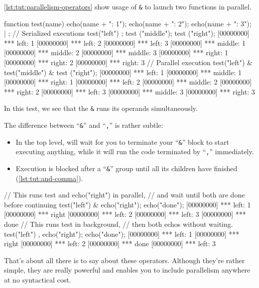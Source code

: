 \autoref{lst:tut:parallelism-operators} show usage of \lstinline{&} to
launch two functions in parallel.

\begin{urbiscript}[caption=Parallelism operator,
  label=lst:tut:parallelism-operators, name=parallel]
function test(name)
{
  echo(name + ": 1");
  echo(name + ": 2");
  echo(name + ": 3");
} | {};
// Serialized executions
test("left") ; test ("middle"); test ("right");
[00000000] *** left: 1
[00000000] *** left: 2
[00000000] *** left: 3
[00000000] *** middle: 1
[00000000] *** middle: 2
[00000000] *** middle: 3
[00000000] *** right: 1
[00000000] *** right: 2
[00000000] *** right: 3
// Parallel execution
test("left") & test("middle") & test ("right");
[00000000] *** left: 1
[00000000] *** middle: 1
[00000000] *** right: 1
[00000000] *** left: 2
[00000000] *** middle: 2
[00000000] *** right: 2
[00000000] *** left: 3
[00000000] *** middle: 3
[00000000] *** right: 3
\end{urbiscript}

In this test, we see that the \lstinline{&} runs its operands
simultaneously.

The difference between ``\lstinline{&}'' and ``\lstinline{,}'' is
rather subtle:

\begin{itemize}
\item In the top level, will wait for you to terminate your
  ``\lstinline{&}'' block to start executing anything, while it will
  run the code terminated by ``\lstinline{,}'' immediately.
\item Execution is blocked after a ``\lstinline{&}'' group until all
  its children have finished (\autoref{lst:tut:and-comma}).
\end{itemize}

\begin{urbiscript}[caption=Difference between ``\lstinline{&}'' and
``\lstinline{,}'', label=lst:tut:and-comma, name=parallel]
// This runs test and echo("right") in parallel,
// and wait until both are done before continuing
test("left") & echo("right"); echo("done");
[00000000] *** left: 1
[00000000] *** right
[00000000] *** left: 2
[00000000] *** left: 3
[00000000] *** done
// This runs test in background,
// then both echos without waiting.
test("left") , echo("right"); echo("done");
[00000000] *** left: 1
[00000000] *** right
[00000000] *** left: 2
[00000000] *** done
[00000000] *** left: 3
\end{urbiscript}

That's about all there is to say about these operators. Although
they're rather simple, they are really powerful and enables you to
include parallelism anywhere at no syntactical cost.

